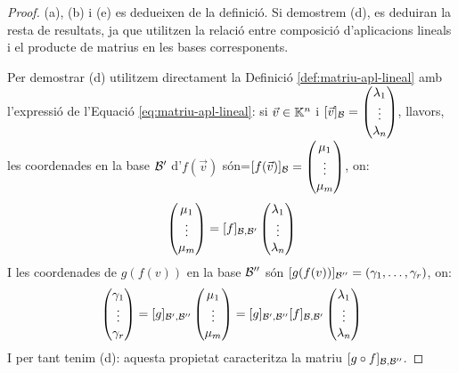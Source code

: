 \documentclass[
  11pt,
]{book}
\numberwithin{dummy}{section}
\theoremstyle{maincolornumbox}
\theoremstyle{blacknumex}
\theoremstyle{blacknumbox}
\theoremstyle{maincolornum}
\newlength\esp
\begin{document}
\begin{proof}
(a), (b) i (e) es dedueixen de la definició. Si demostrem (d),
es deduiran la resta de resultats, ja que utilitzen la relació entre
composició d'aplicacions lineals i el producte de matrius en les bases
corresponents.

Per demostrar (d) utilitzem directament la Definició
\ref{def:matriu-apl-lineal} amb l'expressió de l'Equació
\eqref{eq:matriu-apl-lineal}: si \(\vec v\in \mathbb{K}^n\) i
\([\vec v]_{\mathcal{B}}=\begin{pmatrix}\lambda_1\\\vdots\\\lambda_n\end{pmatrix}\),
llavors, les coordenades en la base \(\mathcal{B}'\) d'\(f(\vec v)\)
són=\([f(\vec v)]_{\mathcal{B}} = \begin{pmatrix}\mu_1\\\vdots\\\mu_m\end{pmatrix}\),
on:
\[\begin{pmatrix}\mu_1\\ \vdots \\ \mu_m \end{pmatrix}=[f]_{\mathcal{B},\mathcal{B}'}\begin{pmatrix}\lambda_1 \\ \vdots \\ \lambda_n \end{pmatrix}\]
I les coordenades de \(g(f(v))\) en la base \(\mathcal{B}''\) són
\([g(f(v))]_{\mathcal{B}''}=(\gamma_1,\dots,\gamma_r)\), on:
\[\begin{pmatrix}\gamma_1\\ \vdots \\ \gamma_r \end{pmatrix}=[g]_{\mathcal{B}',\mathcal{B}''}\begin{pmatrix}\mu_1 \\ \vdots \\ \mu_m \end{pmatrix}=
    [g]_{\mathcal{B}',\mathcal{B}''} [f]_{\mathcal{B},\mathcal{B}'}\begin{pmatrix}\lambda_1 \\ \vdots \\ \lambda_n \end{pmatrix}\]
I per tant tenim (d): aquesta propietat caracteritza la matriu
\([g\circ f]_{\mathcal{B},\mathcal{B}''}\).
\end{proof}
\end{document}
